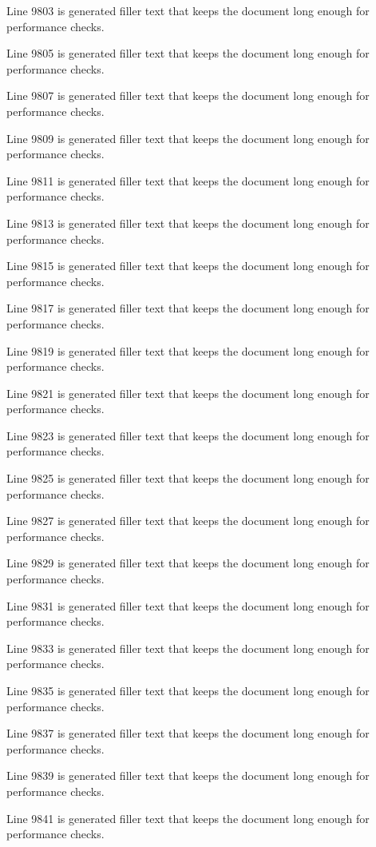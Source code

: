 Line 9803 is generated filler text that keeps the document long enough for performance checks.

Line 9805 is generated filler text that keeps the document long enough for performance checks.

Line 9807 is generated filler text that keeps the document long enough for performance checks.

Line 9809 is generated filler text that keeps the document long enough for performance checks.

Line 9811 is generated filler text that keeps the document long enough for performance checks.

Line 9813 is generated filler text that keeps the document long enough for performance checks.

Line 9815 is generated filler text that keeps the document long enough for performance checks.

Line 9817 is generated filler text that keeps the document long enough for performance checks.

Line 9819 is generated filler text that keeps the document long enough for performance checks.

Line 9821 is generated filler text that keeps the document long enough for performance checks.

Line 9823 is generated filler text that keeps the document long enough for performance checks.

Line 9825 is generated filler text that keeps the document long enough for performance checks.

Line 9827 is generated filler text that keeps the document long enough for performance checks.

Line 9829 is generated filler text that keeps the document long enough for performance checks.

Line 9831 is generated filler text that keeps the document long enough for performance checks.

Line 9833 is generated filler text that keeps the document long enough for performance checks.

Line 9835 is generated filler text that keeps the document long enough for performance checks.

Line 9837 is generated filler text that keeps the document long enough for performance checks.

Line 9839 is generated filler text that keeps the document long enough for performance checks.

Line 9841 is generated filler text that keeps the document long enough for performance checks.

